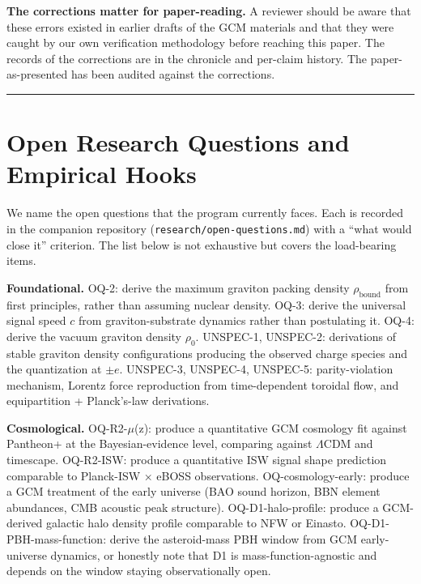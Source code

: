 \documentclass[12pt]{article}
\theoremstyle{definition}
\theoremstyle{remark}
\begin{document}
\textbf{The corrections matter for paper-reading.} A reviewer should be
aware that these errors existed in earlier drafts of the GCM materials
and that they were caught by our own verification methodology before
reaching this paper. The records of the corrections are in the chronicle
and per-claim history. The paper-as-presented has been audited against
the corrections.

\begin{center}\rule{0.5\linewidth}{0.5pt}\end{center}

\section{Open Research Questions and Empirical Hooks}\label{sec:open}

We name the open questions that the program currently faces. Each is
recorded in the companion repository
(\texttt{research/open-questions.md}) with a ``what would close it''
criterion. The list below is not exhaustive but covers the load-bearing
items.

\textbf{Foundational.} OQ-2: derive the maximum graviton packing density
\(\rho_{\text{bound}}\) from first principles, rather than assuming
nuclear density. OQ-3: derive the universal signal speed \(c\) from
graviton-substrate dynamics rather than postulating it. OQ-4: derive the
vacuum graviton density \(\rho_0\). UNSPEC-1, UNSPEC-2: derivations of
stable graviton density configurations producing the observed charge
species and the quantization at \(\pm e\). UNSPEC-3, UNSPEC-4, UNSPEC-5:
parity-violation mechanism, Lorentz force reproduction from
time-dependent toroidal flow, and equipartition + Planck's-law
derivations.

\textbf{Cosmological.} OQ-R2-\(\mu\)(z): produce a quantitative GCM
cosmology fit against Pantheon+ at the Bayesian-evidence level,
comparing against \(\Lambda\)CDM and timescape. OQ-R2-ISW: produce a
quantitative ISW signal shape prediction comparable to Planck-ISW ×
eBOSS observations. OQ-cosmology-early: produce a GCM treatment of the
early universe (BAO sound horizon, BBN element abundances, CMB acoustic
peak structure). OQ-D1-halo-profile: produce a GCM-derived galactic halo
density profile comparable to NFW or Einasto. OQ-D1-PBH-mass-function:
derive the asteroid-mass PBH window from GCM early-universe dynamics, or
honestly note that D1 is mass-function-agnostic and depends on the
window staying observationally open.
\end{document}
